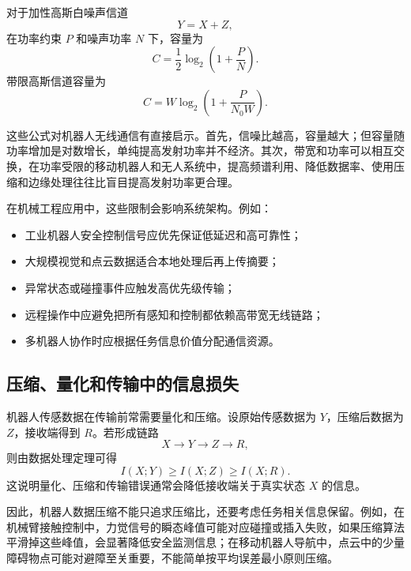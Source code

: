 \documentclass[UTF8,a4paper,12pt]{ctexart}
\begin{document}
对于加性高斯白噪声信道
\begin{equation}
Y=X+Z,
\end{equation}
在功率约束 $P$ 和噪声功率 $N$ 下，容量为
\begin{equation}
C=\frac{1}{2}\log_2\left(1+\frac{P}{N}\right).
\end{equation}
带限高斯信道容量为
\begin{equation}
C=W\log_2\left(1+\frac{P}{N_0W}\right).
\end{equation}

这些公式对机器人无线通信有直接启示。首先，信噪比越高，容量越大；但容量随功率增加是对数增长，单纯提高发射功率并不经济。其次，带宽和功率可以相互交换，在功率受限的移动机器人和无人系统中，提高频谱利用、降低数据率、使用压缩和边缘处理往往比盲目提高发射功率更合理。

在机械工程应用中，这些限制会影响系统架构。例如：
\begin{itemize}
  \item 工业机器人安全控制信号应优先保证低延迟和高可靠性；
  \item 大规模视觉和点云数据适合本地处理后再上传摘要；
  \item 异常状态或碰撞事件应触发高优先级传输；
  \item 远程操作中应避免把所有感知和控制都依赖高带宽无线链路；
  \item 多机器人协作时应根据任务信息价值分配通信资源。
\end{itemize}

\subsection{压缩、量化和传输中的信息损失}

机器人传感数据在传输前常需要量化和压缩。设原始传感数据为 $Y$，压缩后数据为 $Z$，接收端得到 $R$。若形成链路
\begin{equation}
X \rightarrow Y \rightarrow Z \rightarrow R,
\end{equation}
则由数据处理定理可得
\begin{equation}
I(X;Y)\ge I(X;Z)\ge I(X;R).
\end{equation}
这说明量化、压缩和传输错误通常会降低接收端关于真实状态 $X$ 的信息。

因此，机器人数据压缩不能只追求压缩比，还要考虑任务相关信息保留。例如，在机械臂接触控制中，力觉信号的瞬态峰值可能对应碰撞或插入失败，如果压缩算法平滑掉这些峰值，会显著降低安全监测信息；在移动机器人导航中，点云中的少量障碍物点可能对避障至关重要，不能简单按平均误差最小原则压缩。
\end{document}
